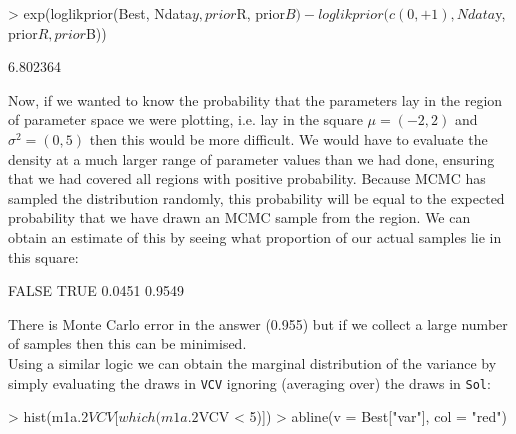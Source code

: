 \documentclass{article}
\begin{document}
\begin{Schunk}
\begin{Sinput}
> exp(loglikprior(Best, Ndata$y, prior$R, prior$B) - loglikprior(c(0, 
+     1), Ndata$y, prior$R, prior$B))
\end{Sinput}
\begin{Soutput}
[1] 6.802364
\end{Soutput}
\end{Schunk}


Now, if we wanted to know the probability that the parameters lay in the region of parameter space we were plotting, i.e. lay in the square $\mu = (-2,2)$ and $\sigma^{2} = (0,5)$ then this would be more difficult. We would have to evaluate the density at a much larger range of parameter values than we had done, ensuring that we had covered all regions with positive probability. Because MCMC has sampled the distribution randomly, this probability will be equal to the expected probability that we have drawn an MCMC sample from the region. We can obtain an estimate of this by seeing what proportion of our actual samples lie in this square:

\begin{Schunk}
\begin{Soutput}
 FALSE   TRUE 
0.0451 0.9549 
\end{Soutput}
\end{Schunk}

There is Monte Carlo error in the answer (0.955) but if we collect a large number of samples then this can be minimised.\\ 

Using a similar logic we can obtain the marginal distribution of the variance by simply evaluating the draws in \texttt{VCV} ignoring (averaging over) the draws in \texttt{Sol}:

\iftalk
\else
\begin{Schunk}
\begin{Sinput}
> hist(m1a.2$VCV[which(m1a.2$VCV < 5)])
> abline(v = Best["var"], col = "red")
\end{Sinput}
\end{Schunk}
\fi
\end{document}
